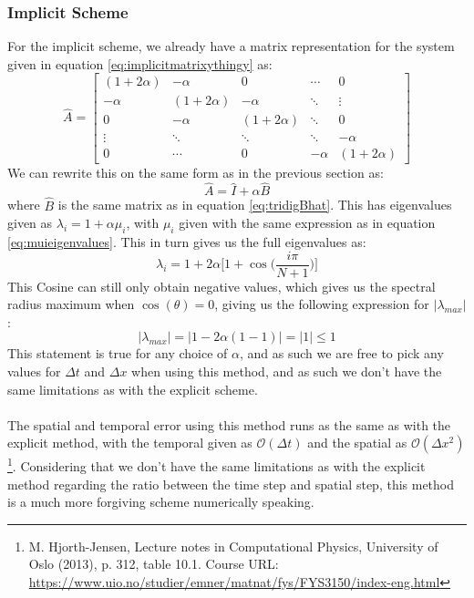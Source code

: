 \documentclass[reprint,english,notitlepage]{revtex4-1}  %
\begin{document}
\subsubsection{Implicit Scheme}

For the implicit scheme, we already have a matrix representation for the system given in equation \ref{eq:implicitmatrixythingy} as:
\begin{equation}
    \hat{A} = \begin{bmatrix} (1+2\alpha) & -\alpha & 0 & \cdots & 0\\ -\alpha & (1+2\alpha) & -\alpha & \ddots & \vdots\\0&-\alpha&(1+2\alpha)&\ddots&0\\\vdots&\ddots&\ddots&\ddots&-\alpha\\0&\cdots&0&-\alpha&(1+2\alpha)\end{bmatrix}
\end{equation}
We can rewrite this on the same form as in the previous section as:
\begin{equation}
    \hat{A} = \hat{I} + \alpha\hat{B}
\end{equation}
where $\hat{B}$ is the same matrix as in equation \ref{eq:tridigBhat}. This has eigenvalues given as $\lambda_i = 1+\alpha\mu_i$, with $\mu_i$ given with the same expression as in equation \ref{eq:muieigenvalues}. This in turn gives us the full eigenvalues as:
\begin{equation}
    \lambda_i = 1 + 2\alpha\Big[1+\cos{\Big(\frac{i\pi}{N+1}}\Big)\Big]
\end{equation}
This Cosine can still only obtain negative values, which gives us the spectral radius maximum when $\cos{(\theta)} = 0$, giving us the following expression for $|\lambda_{max}|$:
\begin{equation}
    |\lambda_{max}| = |1-2\alpha(1-1)| = |1| \leq 1
\end{equation}
This statement is true for any choice of $\alpha$, and as such we are free to pick any values for $\Delta t$ and $\Delta x$ when using this method, and as such we don't have the same limitations as with the explicit scheme.
\\
\\
The spatial and temporal error using this method runs as the same as with the explicit method, with the temporal given as $\mathcal{O}(\Delta t)$ and the spatial as $\mathcal{O}(\Delta x^2)$\footnote{M. Hjorth-Jensen, Lecture notes in Computational Physics, University of Oslo (2013), p. 312, table 10.1. Course URL: \url{https://www.uio.no/studier/emner/matnat/fys/FYS3150/index-eng.html}}. Considering that we don't have the same limitations as with the explicit method regarding the ratio between the time step and spatial step, this method is a much more forgiving scheme numerically speaking.
\end{document}
